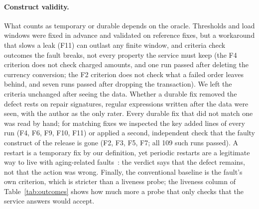 \paragraph{Construct validity.} What counts as temporary or durable depends on the oracle. Thresholds and load windows were
fixed in advance and validated on reference fixes, but a workaround that slows a leak (F11) can outlast any finite window,
and criteria check outcomes the fault breaks, not every property the service must keep (the F4 criterion does not check
charged amounts, and one run passed after deleting the currency conversion; the F2 criterion does not check what a failed
order leaves behind, and seven runs passed after dropping the transaction). We left the criteria unchanged after seeing
the data. Whether a durable fix removed the defect rests on repair signatures, regular expressions written after the data
were seen, with the author as the only rater. Every durable fix that did not match one was read by hand; for matching
fixes we inspected the key added lines of every run (F4, F6, F9, F10, F11) or applied a second, independent check that the
faulty construct of the release is gone (F2, F3, F5, F7; all 109 such runs passed). A restart is a temporary fix by our
definition, yet periodic restarts are a legitimate way to live with aging-related faults~\citep{huang1995rejuvenation,
grottke2007fighting}: the verdict says that the defect remains, not that the action was wrong. Finally, the conventional
baseline is the fault's own criterion, which is stricter than a liveness probe; the liveness column of
Table~\ref{tab:outcomes} shows how much more a probe that only checks that the service answers would accept.

